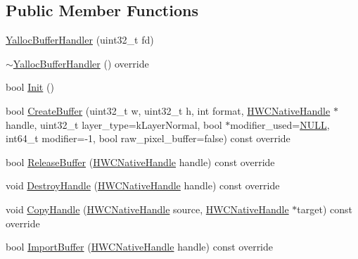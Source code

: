\subsection*{Public Member Functions}
\begin{DoxyCompactItemize}
\item 
\mbox{\hyperlink{classhwcomposer_1_1YallocBufferHandler_adc3ffd722ea3f127968d3f630c4613cc}{Yalloc\+Buffer\+Handler}} (uint32\+\_\+t fd)
\item 
\mbox{\hyperlink{classhwcomposer_1_1YallocBufferHandler_aae88b979e1b15888fe798383a26e3b11}{$\sim$\+Yalloc\+Buffer\+Handler}} () override
\item 
bool \mbox{\hyperlink{classhwcomposer_1_1YallocBufferHandler_ab7d3dfe778d60eab2a9213c9e9acfcdd}{Init}} ()
\item 
bool \mbox{\hyperlink{classhwcomposer_1_1YallocBufferHandler_a33d2042ab272653ebac4fcab8e957c8f}{Create\+Buffer}} (uint32\+\_\+t w, uint32\+\_\+t h, int format, \mbox{\hyperlink{alios_2platformdefines_8h_ac0a2eaf260f556d17fe489911f017bdf}{H\+W\+C\+Native\+Handle}} $\ast$handle, uint32\+\_\+t layer\+\_\+type=k\+Layer\+Normal, bool $\ast$modifier\+\_\+used=\mbox{\hyperlink{alios_2platformdefines_8h_a070d2ce7b6bb7e5c05602aa8c308d0c4}{N\+U\+LL}}, int64\+\_\+t modifier=-\/1, bool raw\+\_\+pixel\+\_\+buffer=false) const override
\item 
bool \mbox{\hyperlink{classhwcomposer_1_1YallocBufferHandler_a1d9ec2a830f6a8df3f454d1e2ac8893c}{Release\+Buffer}} (\mbox{\hyperlink{alios_2platformdefines_8h_ac0a2eaf260f556d17fe489911f017bdf}{H\+W\+C\+Native\+Handle}} handle) const override
\item 
void \mbox{\hyperlink{classhwcomposer_1_1YallocBufferHandler_ae82e3553b77e8dfd8cbe2e30e7a153a3}{Destroy\+Handle}} (\mbox{\hyperlink{alios_2platformdefines_8h_ac0a2eaf260f556d17fe489911f017bdf}{H\+W\+C\+Native\+Handle}} handle) const override
\item 
void \mbox{\hyperlink{classhwcomposer_1_1YallocBufferHandler_a25a75efa29a03adff56a37623ac6242c}{Copy\+Handle}} (\mbox{\hyperlink{alios_2platformdefines_8h_ac0a2eaf260f556d17fe489911f017bdf}{H\+W\+C\+Native\+Handle}} source, \mbox{\hyperlink{alios_2platformdefines_8h_ac0a2eaf260f556d17fe489911f017bdf}{H\+W\+C\+Native\+Handle}} $\ast$target) const override
\item 
bool \mbox{\hyperlink{classhwcomposer_1_1YallocBufferHandler_aac23a7e72fca258da40cd033c78ccd02}{Import\+Buffer}} (\mbox{\hyperlink{alios_2platformdefines_8h_ac0a2eaf260f556d17fe489911f017bdf}{H\+W\+C\+Native\+Handle}} handle) const override

\end{DoxyCompactItemize}
